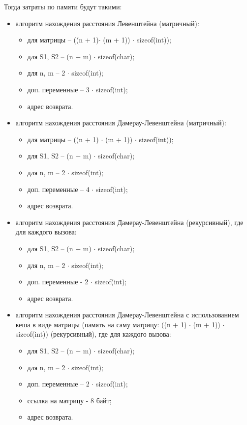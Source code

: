 Тогда затраты по памяти будут такими:
\begin{itemize}
    \item алгоритм нахождения расстояния Левенштейна (матричный):

    \begin{itemize}
        \item для матрицы -- ((n + 1)$ \cdot$ (m + 1)) $ \cdot$ sizeof(int));
        \item для S1, S2 -- (n + m) $ \cdot$ sizeof(char);
        \item для n, m -- 2 $ \cdot$ sizeof(int);
        \item доп. переменные -- 3 $ \cdot$ sizeof(int);
        \item адрес возврата.
    \end{itemize}

    \item алгоритм нахождения расстояния Дамерау-Левенштейна (матричный):

    \begin{itemize}
        \item для матрицы -- ((n + 1) $ \cdot$ (m + 1)) $ \cdot$ sizeof(int));
        \item для S1, S2 -- (n + m) $ \cdot$ sizeof(char);
        \item для n, m -- 2 $ \cdot$ sizeof(int);
        \item доп. переменные -- 4 $ \cdot$ sizeof(int);
        \item адрес возврата.
    \end{itemize}

    \item алгоритм нахождения расстояния Дамерау-Левенштейна (рекурсивный), где для каждого вызова:

    \begin{itemize}
        \item для S1, S2 -- (n + m) $ \cdot$ sizeof(char);
        \item для n, m -- 2 $ \cdot$ sizeof(int);
        \item доп. переменные - 2 $ \cdot$ sizeof(int);
        \item адрес возврата.
    \end{itemize}

    \item алгоритм нахождения расстояния Дамерау-Левенштейна с использованием кеша в виде матрицы (память на саму матрицу: ((n + 1) $ \cdot$ (m + 1)) $ \cdot$ sizeof(int)) (рекурсивный), где для каждого вызова:

    \begin{itemize}
        \item для S1, S2 -- (n + m) $ \cdot$ sizeof(char);
        \item для n, m -- 2 $ \cdot$ sizeof(int);
        \item доп. переменные -- 2 $ \cdot$ sizeof(int);
        \item ссылка на матрицу - 8 байт;
        \item адрес возврата.
    \end{itemize}

\end{itemize}

